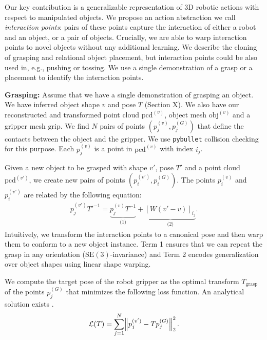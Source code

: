 \documentclass{article}
\newcommand{\pcx}[1]{\mathrm{pcd}^{(#1)}}
\begin{document}
Our key contribution is a generalizable representation of 3D robotic actions with respect to manipulated objects. We propose an action abstraction we call \textit{interaction points}: pairs of these points capture the interaction of either a robot and an object, or a pair of objects. Crucially, we are able to warp interaction points to novel objects without any additional learning. We describe the cloning of grasping and relational object placement, but interaction points could be also used in, e.g., pushing or tossing. We use a single demonstration of a grasp or a placement to identify the interaction points.

\textbf{Grasping:} Assume that we have a single demonstration of grasping an object. We have inferred object shape $v$ and pose $T$ (Section X). We also have our reconstructed and transformed point cloud $\pcx{v}$, object mesh $\mathrm{obj}^{(v)}$ and a gripper mesh $\mathrm{grip}$. We find $N$ pairs of points $(p^{(v)}_j, p^{(G)}_j)$ that define the contacts between the object and the gripper. We use \texttt{pybullet} collision checking for this purpose. Each $p^{(v)}_j$ is a point in $\pcx{v}$ with index $i_j$.

Given a new object to be grasped with shape $v'$, pose $T'$ and a point cloud $\pcx{v'}$, we create new pairs of points $(p^{(v')}_i, p^{(G)}_i)$. The points $p^{(v)}_i$ and $p^{(v')}_i$ are related by the following equation:
\begin{align}
    p^{(v')}_j T'^{-1} = \underbrace{p^{(v)}_j T^{-1}}_{\text{(1)}} + \underbrace{[W(v' - v)]_{i_j}}_{\text{(2)}} \label{eq:contact_point_warping}.
\end{align}
Intuitively, we transform the interaction points to a canonical pose and then warp them to conform to a new object instance. Term 1 ensures that we can repeat the grasp in any orientation ($\mathrm{SE}(3)$-invariance) and Term 2 encodes generalization over object shapes using linear shape warping.

We compute the target pose of the robot gripper as the optimal transform $T_{\text{grasp}}$ of the points $p^{(G)}_j$ that minimizes the following loss function. An analytical solution exists \cite{horn88computation}.
\begin{align}
    \mathcal{L}(T) = \sum_{j=1}^N \norm{ p^{(v')}_j - T p^{(G)}_j }_2^2. \label{eq:coordinate_transform}
\end{align}
\end{document}
